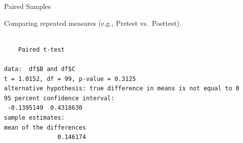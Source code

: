 \begin{frame}[fragile]{Paired Samples}

\center
Comparing repeated measures (e.g., Pretest vs.~Posttest).

\begin{Shaded}
\begin{Highlighting}[]
\OperatorTok{$}\OperatorTok{$} \NormalTok{)}
\end{Highlighting}
\end{Shaded}

\begin{verbatim}

    Paired t-test

data:  df$B and df$C
t = 1.0152, df = 99, p-value = 0.3125
alternative hypothesis: true difference in means is not equal to 0
95 percent confidence interval:
 -0.1395149  0.4318630
sample estimates:
mean of the differences 
               0.146174 
\end{verbatim}

\end{frame}

